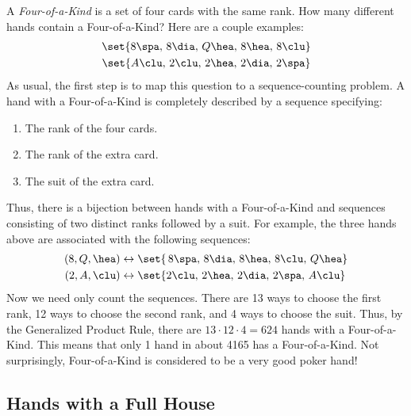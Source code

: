 A \emph{Four-of-a-Kind} is a set of four cards with the same rank.
How many different hands contain a Four-of-a-Kind?  Here are a couple
examples:
\begin{gather*}
\set{ 8 \spa, \, 8 \dia, \, Q \hea, \, 8 \hea, \, 8 \clu  } \\
\set{ A \clu, \, 2 \clu, \, 2 \hea, \, 2 \dia, \, 2 \spa  } \\
\end{gather*}
%
As usual, the first step is to map this question to a
sequence-counting problem.  A hand with a Four-of-a-Kind is completely
described by a sequence specifying:
%
\begin{enumerate}
\item The rank of the four cards.
\item The rank of the extra card.
\item The suit of the extra card.
\end{enumerate}
%
Thus, there is a bijection between hands with a Four-of-a-Kind and
sequences consisting of two distinct ranks followed by a suit.  For
example, the three hands above are associated with the following
sequences:
%
\begin{align*}
(8, Q, \hea)
    & \leftrightarrow
        \set{ \, 8 \spa, \, 8 \dia, \, 8 \hea, \, 8 \clu, \, Q \hea } \\
(2, A, \clu)
    & \leftrightarrow
        \set{ 2 \clu, \, 2 \hea, \, 2 \dia, \, 2 \spa, \, A \clu } \\
\end{align*}
%
Now we need only count the sequences.  There are 13 ways to choose the
first rank, 12 ways to choose the second rank, and 4 ways to choose
the suit.  Thus, by the Generalized Product Rule, there are $13 \cdot
12 \cdot 4 = 624$ hands with a Four-of-a-Kind.  This means that only 1
hand in about 4165 has a Four-of-a-Kind.  Not surprisingly,
Four-of-a-Kind is considered to be a very good poker hand!

\subsection{Hands with a Full House}\label{sec:counting_full_houses}

